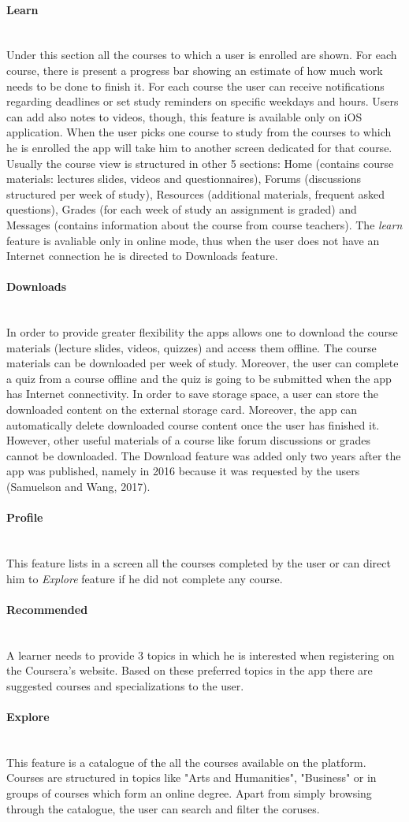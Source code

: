 \documentclass[version=last,fontsize=13pt]{scrartcl}
\newcommand{\myparagraph}[1]{\paragraph{#1}\mbox{}\\}
\begin{document}
		\myparagraph{Learn}
		\indent
		Under this section all the courses to which a user is enrolled are shown. For each course, there is present a progress bar showing an estimate of how much work needs to be done to finish it. For each course the user can receive notifications regarding deadlines or set study reminders on specific weekdays and hours. Users can add also notes to videos, though, this feature is available only on iOS application. When the user picks one course to study from the courses to which he is enrolled the app will take him to another screen dedicated for that course. Usually the course view is structured in other 5 sections: Home (contains course materials: lectures slides, videos and questionnaires), Forums (discussions structured per week of study), Resources (additional materials, frequent asked questions), Grades (for each week of study an assignment is graded) and Messages (contains information about the course from course teachers). The \textit{learn} feature is avaliable only in online mode, thus when the user does not have an Internet connection he is directed to Downloads feature.

		\myparagraph{Downloads}
		\indent
		In order to provide greater flexibility the apps allows one to download the course materials (lecture slides, videos, quizzes) and access them offline. The course materials can be downloaded per week of study. Moreover, the user can complete a quiz from a course offline and the quiz is going to be submitted when the app has Internet connectivity. In order to save storage space, a user can store the downloaded content on the external storage card. Moreover, the app  can automatically delete downloaded course content once the user has finished it. However, other useful materials of a course like forum discussions or grades cannot be downloaded. The Download feature was added only two years after the app was published, namely in 2016 because it was requested by the users (Samuelson and Wang, 2017). 

		\myparagraph{Profile}
		\indent
		This feature lists in a screen all the courses completed by the user or can direct him to \textit{Explore} feature if he did not complete any course.

		\myparagraph{Recommended}
		\indent
		A learner needs to provide 3 topics in which he is interested when registering on the Coursera's website. Based on these preferred topics in the app there are suggested courses and specializations to the user. 

		\myparagraph{Explore}
		\indent
		This feature is a catalogue of the all the courses available on the platform. Courses are structured in topics like "Arts and Humanities", "Business" or in groups of  courses which form an online degree. Apart from simply browsing through the catalogue, the user can search and filter the coruses.
\end{document}
